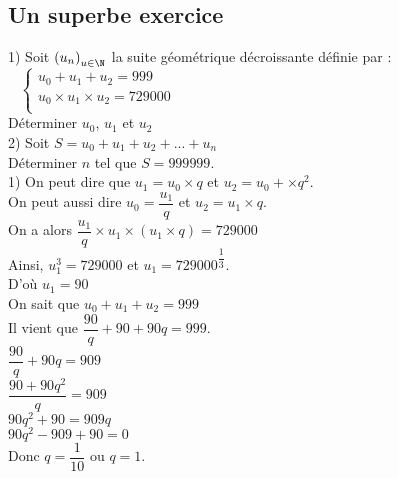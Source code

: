 \vspace*{-5cm}

\newpage

\subsection{Un superbe exercice}

1) Soit $\left(u_n\right)_{u \in \N}$ la suite géométrique décroissante définie par :$ \; \; \; \begin{cases}
u_0 + u_1 + u_2 = 999 \\
u_0 \times u_1 \times u_2 = 729 000 \\
\end{cases}$ \\

Déterminer $u_0$, $u_1$ et $u_2$ \\

2) Soit $S = u_0 + u_1 + u_2 + ... + u_n$ \\

Déterminer $n$ tel que $S = 999 999$. \\

1) On peut dire que $u_1 = u_0 \times q $ et $u_2 = u_0 + \times q^2$. \\ On peut aussi dire $u_0 = \dfrac{u_1}{q}$ et $u_2 = u_1 \times q$. \\

On a alors $\dfrac{u_1}{q} \times u_1 \times \left(u_1 \times q\right) = 729 000$ \\

Ainsi, $u_1^3 = 729 000$ et $u_1 = 729 000^{\dfrac{1}{3}}$. \\

D'où $u_1 = 90$ \\

On sait que $u_0 + u_1 + u_2 = 999$ \\

Il vient que $\dfrac{90}{q} + 90 + 90q = 999$. \\

$\dfrac{90}{q} + 90q = 909$ \\

$\dfrac{90 + 90q^2}{q} = 909$ \\

$90q^2 + 90 = 909q$ \\

$90q^2 - 909 + 90 = 0$ \\ 

Donc $q = \dfrac{1}{10}$ ou $q = 1$. \\

